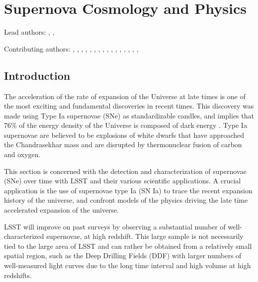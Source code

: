 %
%
%
\clearpage
\section{Supernova Cosmology and Physics}
\def\secname{supernovae}\label{sec:\secname}

\newcommand{\ml}[1]{\textcolor{red}{[{\bf ML}: #1]}}

Lead authors:
,
,

Contributing authors:
,
,
,
,
,
,
,
,
,
,
,
,
,
,
,
,

\subsection{Introduction}
The acceleration of the rate of expansion of the Universe at late times is one of the
most exciting and fundamental discoveries\citep{Riess1998,Perlmutter1999} in recent times.
This discovery was made using Type Ia supernovae (SNe) as standardizable candles, and
implies that 76\% of the energy density of the Universe is composed of dark energy
\citep{Frieman2008}. Type Ia supernovae are believed to be explosions of white
dwarfs that have approached the Chandrasekhar mass and are disrupted by
thermonuclear fusion of carbon and oxygen.


This section is concerned with the detection and characterization of
supernovae (SNe) over time with LSST and their various scientific
applications. A crucial application is the use of supernovae type
Ia (SN Ia) %
to trace the recent expansion history of the universe, and confront models of the
physics driving the late time accelerated expansion of the universe.

LSST will improve on past surveys by observing a substantial number of well-characterized
supernovae, at high redshift. This large sample is not necessarily tied to the large area of LSST
and can rather be obtained from a relatively small spatial region, such as the Deep Drilling Fields
(DDF) with larger numbers of well-measured light curves due to the long time interval and high volume
at high redshifts.

